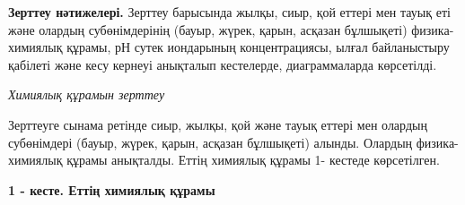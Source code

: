 \begin{multicols}{2}
{\bfseries Зерттеу нәтижелері.} Зерттеу барысында жылқы, сиыр, қой еттері
мен тауық еті және олардың субөнімдерінің (бауыр, жүрек, қарын, асқазан
бұлшықеті) физика-химиялық құрамы, рН сутек иондарының концентрациясы,
ылғал байланыстыру қабілеті және кесу кернеуі анықталып кестелерде,
диаграммаларда көрсетілді.

\emph{Химиялық құрамын зерттеу}

Зерттеуге сынама ретінде сиыр, жылқы, қой және тауық еттері мен олардың
субөнімдері (бауыр, жүрек, қарын, асқазан бұлшықеті) алынды. Олардың
физика-химиялық құрамы анықталды. Еттің химиялық құрамы 1- кестеде
көрсетілген.
\end{multicols}

{\bfseries 1 - кесте. Еттің химиялық құрамы}



